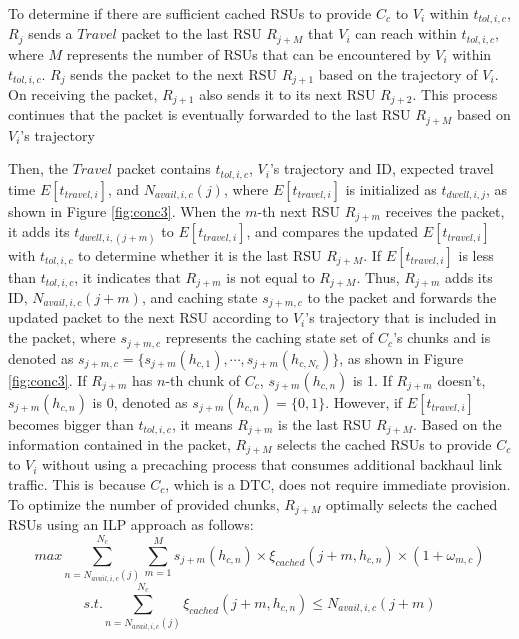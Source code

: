 \documentclass[journal]{IEEEtran}
\begin{document}
To determine if there are sufficient cached RSUs to provide $C_{c}$ to $V_{i}$ within $t_{tol, i, c}$, $R_{j}$ sends a $Travel$ packet to the last RSU $R_{j+M}$ that $V_{i}$ can reach within $t_{tol, i, c}$, where $M$ represents the number of RSUs that can be encountered by $V_{i}$ within $t_{tol, i, c}$.
$R_{j}$ sends the packet to the next RSU $R_{j+1}$ based on the trajectory of $V_{i}$.
On receiving the packet, $R_{j+1}$ also sends it to its next RSU $R_{j+2}$. 
This process continues that the packet is eventually forwarded to the last RSU $R_{j+M}$ based on $V_{i}$'s trajectory


Then, the $Travel$ packet contains $t_{tol,i,c}$, $V_{i}$'s trajectory and ID, expected travel time $E[t_{travel,i}]$, and $N_{avail, i, c}(j)$, where $E[t_{travel,i}]$ is initialized as $t_{dwell,i,j}$, as shown in Figure \ref{fig:conc3}.
When the $m$-th next RSU $R_{j+m}$ receives the packet, it adds its $t_{dwell, i, (j+m)}$ to $E[t_{travel,i}]$, and compares the updated $E[t_{travel,i}]$ with $t_{tol,i,c}$ to determine whether it is the last RSU $R_{j+M}$.
If $E[t_{travel,i}]$ is less than $t_{tol,i,c}$, it indicates that $R_{j+m}$ is not equal to $R_{j+M}$.
Thus, $R_{j+m}$ adds its ID, $N_{avail, i, c}(j+m)$, and caching state $s_{j+m, c}$ to the packet and forwards the updated packet to the next RSU according to $V_{i}$'s trajectory that is included in the packet, where $s_{j+m, c}$ represents the caching state set of $C_{c}$'s chunks and is denoted as $s_{j+m, c}=\{s_{j+m}(h_{c,1}), \cdots, s_{j+m}(h_{c, N_{c}})\}$, as shown in Figure \ref{fig:conc3}.
If $R_{j+m}$ has $n$-th chunk of $C_{c}$, $s_{j+m}(h_{c,n})$ is 1.
If $R_{j+m}$ doesn't, $s_{j+m}(h_{c,n})$ is 0, denoted as $s_{j+m}(h_{c,n})=\{0,1\}$.
However, if $E[t_{travel,i}]$ becomes bigger than $t_{tol,i,c}$, it means $R_{j+m}$ is the last RSU $R_{j+M}$.
Based on the information contained in the packet, $R_{j+M}$ selects the cached RSUs to provide $C_{c}$ to $V_{i}$ without using a precaching process that consumes additional backhaul link traffic.
This is because $C_{c}$, which is a DTC, does not require immediate provision.
To optimize the number of provided chunks, $R_{j+M}$ optimally selects the cached RSUs using an ILP approach as follows:
\begin{equation}
    max \sum^{N_{c}}_{n=N_{avail,i,c}(j)}\sum^{M}_{m=1}s_{j+m}(h_{c,n})\times\xi_{cached}(j+m,h_{c,n})\times(1+\omega_{m,c})
\end{equation}
\begin{equation} \label{eq:const1}
    s.t. \sum^{N_{c}}_{n=N_{avail,i,c}(j)}\xi_{cached}(j+m,h_{c,n})\leq N_{avail,i,c}(j+m)
\end{equation}
\end{document}
